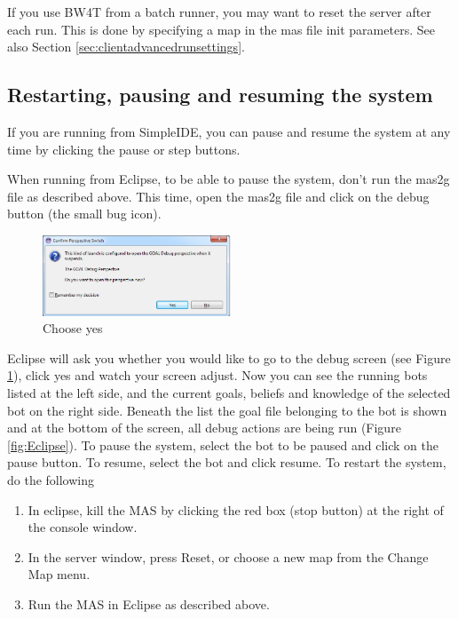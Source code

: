\documentclass[11pt,a4paper]{article}
\begin{document}
If you use BW4T from a batch runner, you may want to reset the server after each run. This is done by specifying a map in the mas file init parameters. See also Section \ref{sec:clientadvancedrunsettings}.

\subsection{Restarting, pausing and resuming the system}
If you are running from SimpleIDE, you can pause and resume the system at any time by clicking the pause or step buttons. 

When running from Eclipse, to be able to pause the system, don't run the mas2g file as described above. This time, open the mas2g file and click on the debug button (the small bug icon).

\begin{figure}
  \begin{center}
    \includegraphics[width=0.5\textwidth]{debug.png}
  \end{center}
  \caption{Choose yes}\label{fig:EclipseDebug}
\end{figure}
Eclipse will ask you whether you would like to go to the debug screen (see Figure \ref{fig:EclipseDebug}), click yes and watch your screen adjust.
Now you can see the running bots listed at the left side, and the current goals, beliefs and knowledge of the selected bot on the right side. Beneath the list the goal file belonging to the bot is shown and at the bottom of the screen, all debug actions are being run (Figure \ref{fig:Eclipse}).
To pause the system, select the bot to be paused and click on the pause button. To resume, select the bot and click resume.
To restart the system, do the following
\begin{enumerate}
\item In eclipse, kill the MAS by clicking the red box (stop button) at the right of the console window.
\item In the server window, press Reset, or choose a new map from the Change Map menu.
\item Run the MAS in Eclipse as described above.
\end{enumerate}
\end{document}
